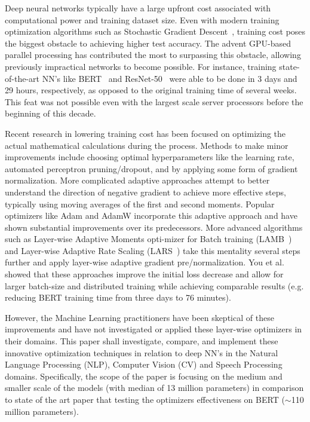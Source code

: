 Deep neural networks typically have a large upfront cost associated with computational power and training dataset size. Even with modern training optimization algorithms such as Stochastic Gradient Descent~\cite{SGD}, training cost poses the biggest obstacle to achieving higher test accuracy. The advent GPU-based parallel processing has contributed the most to surpassing this obstacle, allowing previously impractical networks to become possible. For instance, training state-of-the-art NN's like BERT~\cite{bert} and ResNet-50~\cite{resnet} were able to be done in 3 days and 29 hours, respectively, as opposed to the original training time of several weeks. This feat was not possible even with the largest scale server processors before the beginning of this decade. 

Recent research in lowering training cost has been focused on optimizing the actual mathematical calculations during the process. Methods to make minor improvements include choosing optimal hyperparameters like the learning rate, automated perceptron pruning/dropout\cite{autopercept}, and by applying some form of gradient normalization. More complicated adaptive approaches attempt to better understand the direction of negative gradient to achieve more effective steps, typically using moving averages of the first and second moments. Popular optimizers like Adam and AdamW incorporate this adaptive approach and have shown substantial improvements over its predecessors\cite{Loshchilov2017FixingWD}. More advanced algorithms such as Layer-wise Adaptive Moments opti-mizer for Batch training (LAMB~\cite{You2020Large}) and Layer-wise Adaptive
Rate Scaling (LARS~\cite{qian2020impact, ginsburg2018large}) take this mentality several steps further and apply layer-wise adaptive gradient pre/normalization. You et al. showed that these approaches improve the initial loss decrease and allow for larger batch-size and distributed training while achieving comparable results (e.g. reducing BERT training time from three days to 76 minutes).  

However, the Machine Learning practitioners have been skeptical of these improvements and have not investigated or applied these layer-wise optimizers in their domains. This paper shall investigate, compare, and implement these innovative optimization techniques in relation to deep NN's in the Natural Language Processing (NLP), Computer Vision (CV) and Speech Processing domains. Specifically, the scope of the paper is focusing on the medium and smaller scale of the models (with median of 13 million parameters) in comparison to state of the art paper that testing the optimizers effectiveness on BERT ($\sim$110 million parameters). 


